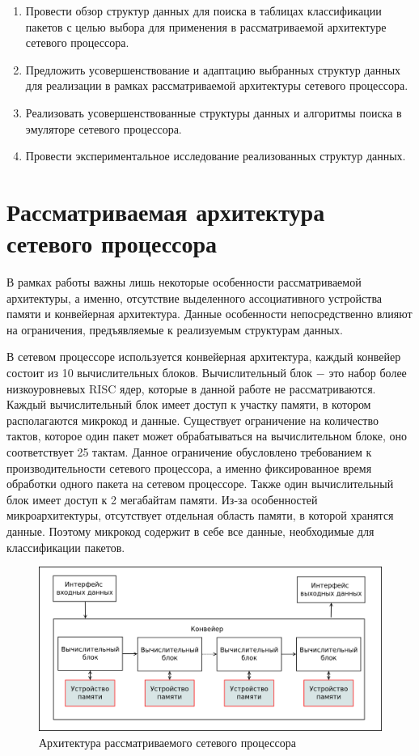 \documentclass[a4paper, 12pt, titlepage, finall]{extreport}
\begin{document}
        \begin{enumerate}
            \item Провести обзор структур данных для поиска в таблицах классификации пакетов с целью выбора для применения в рассматриваемой архитектуре сетевого процессора.
            \item Предложить усовершенствование и адаптацию выбранных структур данных для реализации в рамках рассматриваемой архитектуры сетевого процессора.
            \item Реализовать усовершенствованные структуры данных и алгоритмы поиска в эмуляторе сетевого процессора.
            \item Провести экспериментальное исследование реализованных структур данных.
        \end{enumerate}
       
    \chapter{Рассматриваемая архитектура сетевого процессора}
        В рамках работы важны лишь некоторые особенности рассматриваемой архитектуры, а именно, отсутствие выделенного ассоциативного устройства памяти и конвейерная архитектура. 
        Данные особенности непосредственно влияют на ограничения, предъявляемые к реализуемым структурам данных.

        В сетевом процессоре используется конвейерная архитектура, каждый конвейер состоит из 10 вычислительных блоков. 
        Вычислительный блок $-$ это набор более низкоуровневых RISC ядер, которые в данной работе не рассматриваются. 
        Каждый вычислительный блок имеет доступ к участку памяти, в котором располагаются микрокод и данные.
        Существует ограничение на количество тактов, которое один пакет может обрабатываться на вычислительном блоке, оно соответствует 25 тактам.
        Данное ограничение обусловлено требованием к производительности сетевого процессора, а именно фиксированное время обработки одного пакета на сетевом процессоре.
        Также один вычислительный блок имеет доступ к 2 мегабайтам памяти.
        Из-за особенностей микроархитектуры, отсутствует отдельная область памяти, в которой хранятся данные. Поэтому микрокод содержит в себе все данные,
        необходимые для классификации пакетов.

        \begin{figure}[h]
            \includegraphics[width=\textwidth]{npu_all.png}
            \caption{Архитектура рассматриваемого сетевого процессора}
        \end{figure}
        
\end{document}
